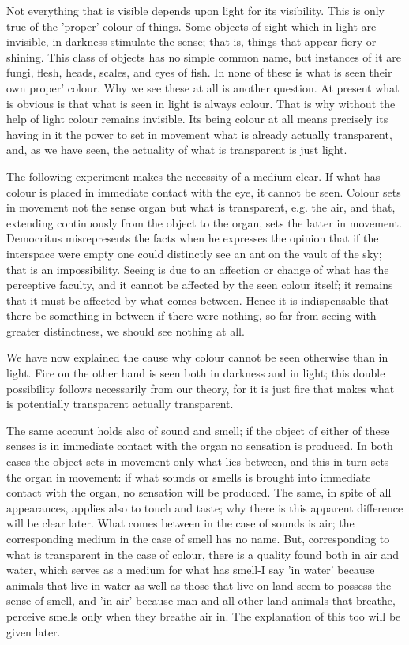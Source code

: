 Not everything that is visible depends upon light for its visibility.
This is only true of the 'proper' colour of things. Some objects of
sight which in light are invisible, in darkness stimulate the sense;
that is, things that appear fiery or shining. This class of objects
has no simple common name, but instances of it are fungi, flesh, heads,
scales, and eyes of fish. In none of these is what is seen their own
proper' colour. Why we see these at all is another question. At present
what is obvious is that what is seen in light is always colour. That
is why without the help of light colour remains invisible. Its being
colour at all means precisely its having in it the power to set in
movement what is already actually transparent, and, as we have seen,
the actuality of what is transparent is just light. 

The following experiment makes the necessity of a medium clear. If
what has colour is placed in immediate contact with the eye, it cannot
be seen. Colour sets in movement not the sense organ but what is transparent,
e.g. the air, and that, extending continuously from the object to
the organ, sets the latter in movement. Democritus misrepresents the
facts when he expresses the opinion that if the interspace were empty
one could distinctly see an ant on the vault of the sky; that is an
impossibility. Seeing is due to an affection or change of what has
the perceptive faculty, and it cannot be affected by the seen colour
itself; it remains that it must be affected by what comes between.
Hence it is indispensable that there be something in between-if there
were nothing, so far from seeing with greater distinctness, we should
see nothing at all. 

We have now explained the cause why colour cannot be seen otherwise
than in light. Fire on the other hand is seen both in darkness and
in light; this double possibility follows necessarily from our theory,
for it is just fire that makes what is potentially transparent actually
transparent. 

The same account holds also of sound and smell; if the object of either
of these senses is in immediate contact with the organ no sensation
is produced. In both cases the object sets in movement only what lies
between, and this in turn sets the organ in movement: if what sounds
or smells is brought into immediate contact with the organ, no sensation
will be produced. The same, in spite of all appearances, applies also
to touch and taste; why there is this apparent difference will be
clear later. What comes between in the case of sounds is air; the
corresponding medium in the case of smell has no name. But, corresponding
to what is transparent in the case of colour, there is a quality found
both in air and water, which serves as a medium for what has smell-I
say 'in water' because animals that live in water as well as those
that live on land seem to possess the sense of smell, and 'in air'
because man and all other land animals that breathe, perceive smells
only when they breathe air in. The explanation of this too will be
given later. 

